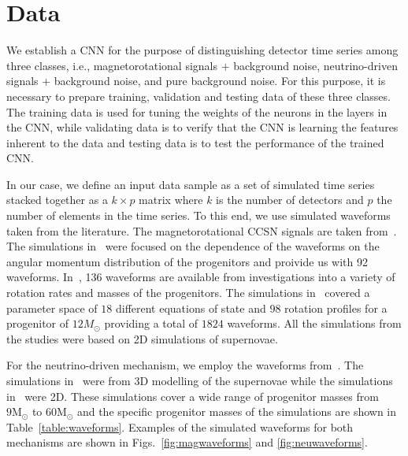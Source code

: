 \documentclass[aps,twocolumn,showpacs,groupedaddress, nofootinbib]{revtex4}  %
\begin{document}
\section{Data}\label{sec:spwf}
%
%
We establish a \ac{CNN} for the purpose of distinguishing detector time series
among three classes, i.e., magnetorotational signals $+$ background noise,
neutrino-driven signals $+$ background noise, and pure background noise. For
this purpose, it is necessary to prepare training, validation and testing data
of these three classes. The training data is used for tuning the weights of
the neurons in the layers in the \ac{CNN}, while validating data is to verify
that the \ac{CNN} is learning the features inherent to the data and testing
data is to test the performance of the trained \ac{CNN}. 

%
%
In our case, we define an input data sample as a set of simulated time series
stacked together as a $k \times p$ matrix where $k$ is the number of detectors
and $p$ the number of elements in the time series. To this end, we use
simulated waveforms taken from the literature. The magnetorotational \ac{CCSN}
signals are taken from~\cite{abdikamalov2014measuring,
dimmelmeier2008gravitational, richers2017equation}. The simulations
in~\cite{abdikamalov2014measuring} were focused on the dependence of the
waveforms on the angular momentum distribution of the progenitors and proivide
us with 92 waveforms. In~\cite{dimmelmeier2008gravitational}, 136 waveforms are
available from investigations into a variety of rotation rates and masses of
the progenitors. The simulations in~\cite{richers2017equation} covered a
parameter space of $18$ different equations of state and $98$ rotation profiles
for a progenitor of $12M_{\odot}$ providing a total of $1824$ waveforms. All
the simulations from the studies were based on 2D simulations of supernovae.

%
%
For the neutrino-driven mechanism, we employ the waveforms
from~\cite{10.1093mnrasstz990, kuroda2017correlated, muller2012parametrized,
powell2019gravitational, radice2019characterizing, yakunin2015gravitational,
yakunin2017gravitational, ott2009gravitational, murphy2009model,
ott2013general}. The simulations in~\cite{10.1093mnrasstz990,
kuroda2017correlated, muller2012parametrized, powell2019gravitational,
radice2019characterizing, yakunin2017gravitational} were from 3D modelling of
the supernovae while the simulations in~\cite{yakunin2015gravitational,
ott2009gravitational, murphy2009model, ott2013general} were 2D. These
simulations cover a wide range of progenitor masses from $9\text{M}_\odot$ to
$60\text{M}_\odot$ and the specific progenitor masses of the simulations are
shown in Table~\ref{table:waveforms}. Examples of the simulated waveforms for
both mechanisms are shown in Figs.~\ref{fig:magwaveforms} and
\ref{fig:neuwaveforms}.
\end{document}
